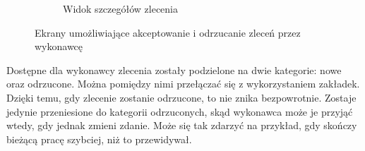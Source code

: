 \begin{figure}[ht]
\begin{subfigure}[t]{0.32\textwidth}
    \centering
    \caption{Widok szczegółów zlecenia}
  \end{subfigure}
  \caption{Ekrany umożliwiające akceptowanie i odrzucanie zleceń przez wykonawcę}
  \label{fig:expert-jobs}
\end{figure}

Dostępne dla wykonawcy zlecenia zostały podzielone na dwie kategorie: nowe oraz odrzucone. Można pomiędzy nimi przełączać się z wykorzystaniem zakładek. Dzięki temu, gdy zlecenie zostanie odrzucone, to nie znika bezpowrotnie. Zostaje jedynie przeniesione do kategorii odrzuconych, skąd wykonawca może je przyjąć wtedy, gdy jednak zmieni zdanie. Może się tak zdarzyć na przykład, gdy skończy bieżącą pracę szybciej, niż to przewidywał.


